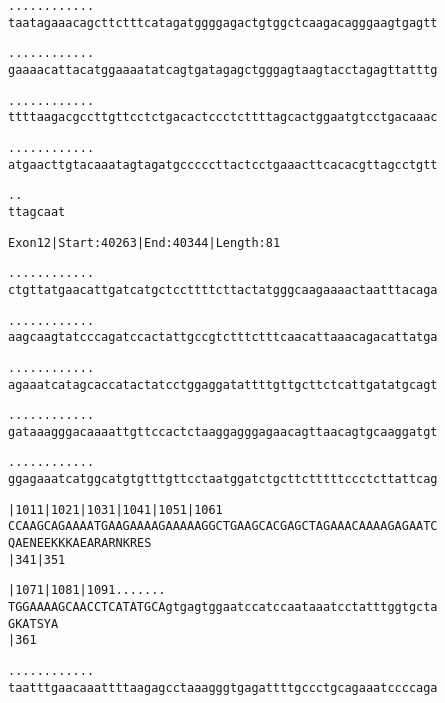 \documentclass{article}
\begin{document}
\newpage
\begin{alltt}
  .    .    .    .    .    .    .    .    .    .    .    .
taatagaaacagcttctttcatagatggggagactgtggctcaagacagggaagtgagtt



  .    .    .    .    .    .    .    .    .    .    .    .
gaaaacattacatggaaaatatcagtgatagagctgggagtaagtacctagagttatttg



  .    .    .    .    .    .    .    .    .    .    .    .
ttttaagacgccttgttcctctgacactccctcttttagcactggaatgtcctgacaaac



  .    .    .    .    .    .    .    .    .    .    .    .
atgaacttgtacaaatagtagatgcccccttactcctgaaacttcacacgttagcctgtt



  .    .
ttagcaat


\end{alltt}
\newpage
\begin{alltt}
Exon 12 | Start: 40263 | End: 40344 | Length: 81

.    .    .    .    .    .    .    .    .    .    .    .
ctgttatgaacattgatcatgctccttttcttactatgggcaagaaaactaatttacaga



.    .    .    .    .    .    .    .    .    .    .    .
aagcaagtatcccagatccactattgccgtctttctttcaacattaaacagacattatga



.    .    .    .    .    .    .    .    .    .    .    .
agaaatcatagcaccatactatcctggaggatattttgttgcttctcattgatatgcagt



.    .    .    .    .    .    .    .    .    .    .    .
gataaagggacaaaattgttccactctaaggagggagaacagttaacagtgcaaggatgt



.    .    .    .    .    .    .    .    .    .    .    .
ggagaaatcatggcatgtgtttgttcctaatggatctgcttctttttccctcttattcag



|1011     |1021     |1031     |1041     |1051     |1061
CCAAGCAGAAAATGAAGAAAAGAAAAAGGCTGAAGCACGAGCTAGAAACAAAAGAGAATC
 Q  A  E  N  E  E  K  K  K  A  E  A  R  A  R  N  K  R  E  S
          |341                          |351

|1071     |1081     |1091 .    .    .    .    .    .    .
TGGAAAAGCAACCTCATATGCAgtgagtggaatccatccaataaatcctatttggtgcta
 G  K  A  T  S  Y  A
          |361

 .    .    .    .    .    .    .    .    .    .    .    .
taatttgaacaaattttaagagcctaaagggtgagattttgccctgcagaaatccccaga



\end{alltt}
\end{document}
